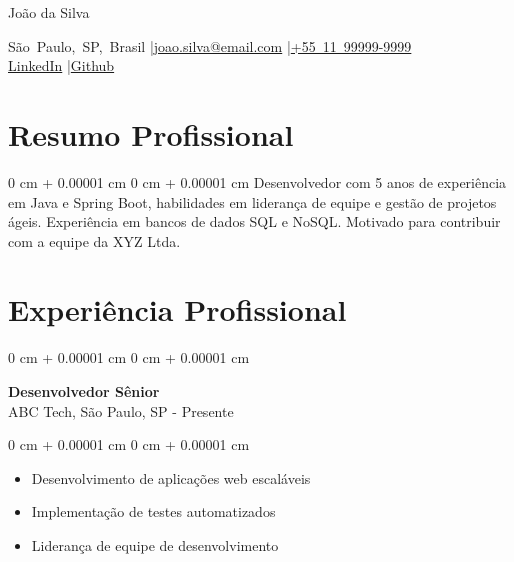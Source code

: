 \documentclass[10pt, letterpaper]{article}
\newenvironment{highlights}{
    \begin{itemize}[
        topsep=0.10 cm,
        parsep=0.10 cm,
        partopsep=0pt,
        itemsep=0pt,
        leftmargin=0 cm + 10pt
    ]
}{
    \end{itemize}
}
\newenvironment{onecolentry}{
    \begin{adjustwidth}{
        0 cm + 0.00001 cm
    }{
        0 cm + 0.00001 cm
    }
}{
    \end{adjustwidth}
}
\newenvironment{header}{
    \setlength{\topsep}{0pt}\par\kern\topsep\centering\linespread{1.5}
}{
    \par\kern\topsep
}
\begin{document}
\begin{header}
    {\fontsize{25pt}{25pt}\selectfont João da Silva}

    \vspace{0pt}

    \normalsize
    \mbox{São Paulo, SP, Brasil} \enskip|\enskip \mbox{\href{mailto:joao.silva@email.com}{joao.silva@email.com}} \enskip|\enskip \mbox{\href{tel:+5511999999999}{+55 11 99999-9999}} \\
    \mbox{\href{https://www.linkedin.com/in/joao-silva}{LinkedIn}} \enskip|\enskip \mbox{\href{https://github.com/joao-silva}{Github}}
\end{header}

\vspace{5pt - 0.1cm}

\section{Resumo Profissional}
\begin{onecolentry}{Desenvolvedor com 5 anos de experiência em Java e Spring Boot, habilidades em liderança de equipe e gestão de projetos ágeis. Experiência em bancos de dados SQL e NoSQL. Motivado para contribuir com a equipe da XYZ Ltda.}\end{onecolentry}
\section{Experiência Profissional}

\begin{onecolentry}
    \setcolumnwidth{\fill, 4.5cm}
    \begin{paracol}{2}
        \textbf{Desenvolvedor Sênior} \\ ABC Tech, São Paulo, SP
        \switchcolumn
         - Presente
    \end{paracol}
\end{onecolentry}
\vspace{0.10cm}
\begin{onecolentry}
    \begin{highlights}
                \item Desenvolvimento de aplicações web escaláveis
                \item Implementação de testes automatizados
                \item Liderança de equipe de desenvolvimento
    \end{highlights}
\end{onecolentry}
\end{document}
